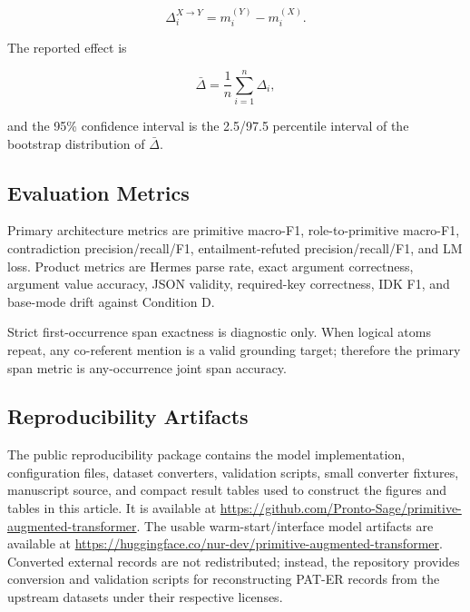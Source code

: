\begin{equation}
\Delta_i^{X\rightarrow Y} = m_i^{(Y)} - m_i^{(X)}.
\label{eq:paired_delta}
\end{equation}

The reported effect is

\begin{equation}
\bar{\Delta} = \frac{1}{n}\sum_{i=1}^{n}\Delta_i,
\label{eq:mean_delta}
\end{equation}

and the 95\% confidence interval is the 2.5/97.5 percentile interval of the
bootstrap distribution of $\bar{\Delta}$.

\subsection{Evaluation Metrics}

Primary architecture metrics are primitive macro-F1, role-to-primitive macro-F1,
contradiction precision/recall/F1, entailment-refuted precision/recall/F1, and
LM loss. Product metrics are Hermes parse rate, exact argument correctness,
argument value accuracy, JSON validity, required-key correctness, IDK F1, and
base-mode drift against Condition D.

Strict first-occurrence span exactness is diagnostic only. When logical atoms
repeat, any co-referent mention is a valid grounding target; therefore the
primary span metric is any-occurrence joint span accuracy.

\subsection{Reproducibility Artifacts}

The public reproducibility package contains the model implementation,
configuration files, dataset converters, validation scripts, small converter
fixtures, manuscript source, and compact result tables used to construct the
figures and tables in this article. It is available at
\url{https://github.com/Pronto-Sage/primitive-augmented-transformer}. The
usable warm-start/interface model artifacts are available at
\url{https://huggingface.co/nur-dev/primitive-augmented-transformer}. Converted
external records are not redistributed; instead, the repository provides
conversion and validation scripts for reconstructing PAT-ER records from the
upstream datasets under their respective licenses.
